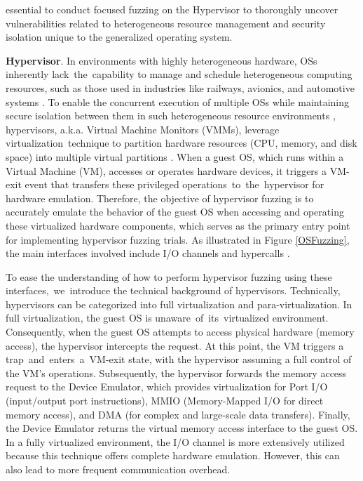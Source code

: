 essential to conduct focused fuzzing on the Hypervisor to thoroughly uncover vulnerabilities related to heterogeneous resource management and security isolation unique to the generalized operating system.


\textbf{Hypervisor}. In environments with highly heterogeneous hardware, OSs inherently lack~the~capability to manage and schedule heterogeneous computing resources, such as those used in industries like railways, avionics, and automotive systems \cite{Cinque2021VirtualizingMS}. To enable the concurrent execution of multiple OSs while maintaining secure isolation between them in such heterogeneous resource environments \cite{RTCA_DO_178C, ISO_26262_2011}, hypervisors, a.k.a. Virtual Machine Monitors (VMMs), leverage virtualization~technique to partition hardware resources (\eg CPU, memory, and disk space) into multiple virtual partitions \cite{Popek1974FormalRF, Cinque2021VirtualizingMS, Cilardo2021VirtualizationOM}. When a guest OS, which runs within a Virtual Machine (VM), accesses or operates hardware devices, it triggers a VM-exit event that transfers these privileged operations~to~the~hypervisor for hardware emulation. Therefore, the objective of hypervisor fuzzing is to accurately emulate the behavior of the guest OS when accessing and operating these virtualized hardware components, which serves as the primary entry point for implementing hypervisor fuzzing trials. As illustrated in Figure \ref{OSFuzzing}, the main interfaces involved include I/O channels and hypercalls . 

To ease the understanding of how to perform hypervisor fuzzing using these interfaces,~we~introduce the technical background of hypervisors. Technically, hypervisors can be categorized into full virtualization and para-virtualization. In full virtualization, the guest OS is unaware~of~its~virtualized environment. Consequently, when the guest OS attempts to access physical hardware (\eg memory access), the hypervisor intercepts the request. At this point, the VM triggers a trap~and~enters~a~VM-exit state, with the hypervisor assuming a full control of the VM's operations. Subsequently, the hypervisor forwards the memory access request to the Device Emulator, which provides virtualization for Port I/O (input/output port instructions), MMIO (Memory-Mapped I/O for direct memory access), and DMA (for complex and large-scale data transfers). Finally, the Device Emulator returns the virtual memory access interface to the guest OS. In a fully virtualized environment, the I/O channel is more extensively utilized because this technique offers complete hardware emulation. However, this can also lead to more frequent communication overhead.

